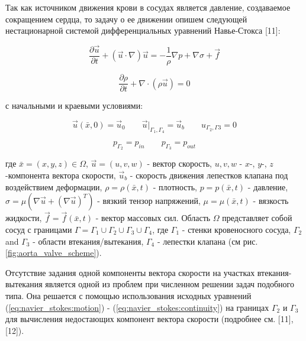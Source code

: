 Так как источником движения крови в сосудах является давление,
создаваемое сокращением сердца, то задачу о ее движении опишем следующей
нестационарной системой дифференциальных уравнений Навье-Стокса
{[}11{]}:

\begin{equation}\frac{\partial \vec{u}}{\partial t} + (\vec{u} \cdot \nabla) \vec{u} = - \frac{1}{\rho} \nabla p + \nabla \sigma + \vec{f}\label{eq:navier_stokes:motion}\end{equation}

\begin{equation}\frac{\partial \rho}{\partial t} + \nabla \cdot (\rho \vec{u}) = 0\label{eq:navier_stokes:continuity}\end{equation}

с начальными и краевыми условиями:

\begin{equation}\vec{u}(\bar{x}, 0) = \vec{u}_0 \qquad \vec{u}|_{\Gamma_1, \Gamma_4} = \vec{u}_b \qquad u_{\Gamma_2, \Gamma3} = 0\label{eq:navier_stokes:velocity_conditions}\end{equation}

\begin{equation}p_{\Gamma_2} = p_{in} \qquad p_{\Gamma_3} = p_{out}\label{eq:navier_stokes:pressure_conditions}\end{equation}

где \(\bar{x}=(x,y,z) \in \Omega\), \(\vec{u}=(u,v,w)\) - вектор
скорость, \(u, v, w\) - \(x\)-, \(y\)-, \(z\)-компонента вектора
скорости, \(\vec{u}_b\) - скорость движения лепестков клапана под
воздействием деформации, \(\rho=\rho(\bar{x}, t)\) - плотность,
\(p=p(\bar{x}, t)\) - давление,
\(\sigma = \mu (\nabla \vec{u} + (\nabla \vec{u})^T)\) - вязкий тензор
напряжений, \(\mu = \mu(\bar{x}, t)\) - вязкость жидкости,
\(\vec{f} = \vec{f}(\bar{x}, t)\) - вектор массовых сил. Область
\(\Omega\) представляет собой сосуд с границами
\(\Gamma = \Gamma_1 \cup \Gamma_2 \cup \Gamma_3 \cup \Gamma_4\), где
\(\Gamma_1\) - стенки кровеносного сосуда, \(\Gamma_2\) and \(\Gamma_3\)
- области втекания/вытекания, \(\Gamma_4\) - лепестки клапана (см рис.
\ref{fig:aorta_valve_scheme}).

Отсутствие задания одной компоненты вектора скорости на участках
втекания-вытекания является одной из проблем при численном решении задач
подобного типа. Она решается с помощью использования исходных уравнений
(\ref{eq:navier_stokes:motion}) - (\ref{eq:navier_stokes:continuity}) на
границах \(\Gamma_2\) и \(\Gamma_3\) для вычисления недостающих
компонент вектора скорости (подробнее см. {[}11{]}, {[}12{]}).

